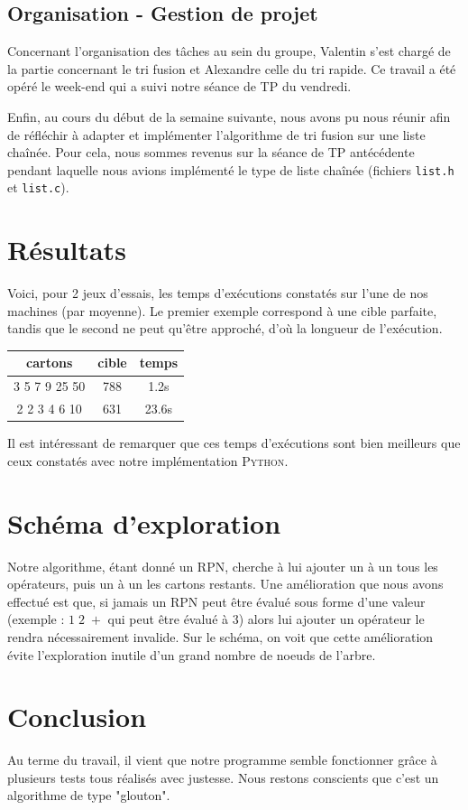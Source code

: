 \documentclass[11pt]{article}
\begin{document}
\subsection{Organisation - Gestion de projet}

Concernant l'organisation des tâches au sein du groupe, Valentin s'est chargé de la partie concernant le tri fusion et Alexandre celle du tri rapide. Ce travail a été opéré le week-end qui a suivi notre séance de TP du vendredi.

Enfin, au cours du début de la semaine suivante, nous avons pu nous réunir afin de réfléchir à adapter et implémenter l'algorithme de tri fusion sur une liste chaînée. Pour cela, nous sommes revenus sur la séance de TP antécédente pendant laquelle nous avions implémenté le type de liste chaînée (fichiers \texttt{list.h} et \texttt{list.c}).




\section{Résultats}

Voici, pour 2 jeux d'essais, les temps d'exécutions constatés sur l'une de nos machines (par moyenne).
Le premier exemple correspond à une cible parfaite, tandis que le second ne peut qu'être approché, d'où la longueur de l'exécution.

\begin{center}
\begin{tabular}{||c c c||} 
 \hline
 cartons & cible & temps \\ [0.5ex] 
 \hline\hline
 3 5 7 9 25 50 & 788 & 1.2s \\ 
 \hline
 2 2 3 4 6 10 & 631 & 23.6s \\ [1ex] 
\hline
\end{tabular}
\end{center}

Il est intéressant de remarquer que ces temps d'exécutions sont bien meilleurs que ceux constatés avec notre implémentation \textsc{Python}.

\section{Schéma d'exploration}

Notre algorithme, étant donné un RPN, cherche à lui ajouter un à un tous les opérateurs, puis un à un les cartons restants.
Une amélioration que nous avons effectué est que, si jamais un RPN peut être évalué sous forme d'une valeur (exemple : $1 \; 2 \; +$ qui peut être évalué à $3$) alors lui ajouter un opérateur le rendra nécessairement invalide. Sur le schéma, on voit que cette amélioration évite l'exploration inutile d'un grand nombre de noeuds de l'arbre.


\section{Conclusion}

\quad \quad Au terme du travail, il vient que notre programme semble fonctionner grâce à plusieurs tests tous réalisés avec justesse. Nous restons conscients que c'est un algorithme de type "glouton".
\end{document}
